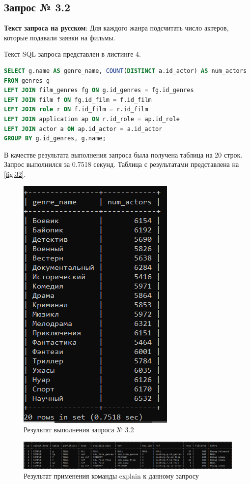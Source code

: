 \documentclass[11pt,a4paper,final]{article} %
\begin{document}
\subsection{Запрос № 3.2}

\par \textbf{Текст запроса на русском}: Для каждого жанра подсчитать число актеров, которые подавали заявки на фильмы. 
\par Текст SQL запроса представлен в листинге 4.

\begin{lstlisting}[caption=SQL запрос № 3.2, language=SQL]
SELECT g.name AS genre_name, COUNT(DISTINCT a.id_actor) AS num_actors
FROM genres g
LEFT JOIN film_genres fg ON g.id_genres = fg.id_genres
LEFT JOIN film f ON fg.id_film = f.id_film
LEFT JOIN role r ON f.id_film = r.id_film
LEFT JOIN application ap ON r.id_role = ap.id_role
LEFT JOIN actor a ON ap.id_actor = a.id_actor
GROUP BY g.id_genres, g.name;
\end{lstlisting}

\par В качестве результата выполнения запроса была получена таблица на 20 строк. Запрос выполнился за 0.7518 секунд. Таблица с результатами представлена на \autoref{fig:32}.

\newpage
\begin{figure}[H]
	\centering
	\includegraphics[width=0.3\linewidth]{32.png}
	\caption{Результат выполнения запроса № 3.2}
	\label{fig:32}
\end{figure}

\begin{figure}[H]
	\centering
	\includegraphics[width=1.0\linewidth]{e32.png}
	\caption{Результат применения команды explain к данному запросу}
	\label{fig:e32}
\end{figure}
\end{document}
